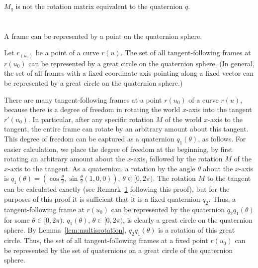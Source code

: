 \begin{rmk}
$M_q$ is not the rotation matrix equivalent to the quaternion $q$.
\end{rmk}

\section{}

A frame can be represented by a point on the quaternion sphere.

\begin{theorem}
\label{thm:greatcircle}
Let $r_(u_0)$ be a point of a curve $r(u)$.
The set of all tangent-following frames at $r(u_0)$
can be represented by a great circle on the quaternion sphere.
(In general, the set of all frames with a fixed coordinate axis pointing
along a fixed vector can be represented by a great circle on the quaternion sphere.)
\end{theorem}
\prf
There are many tangent-following frames at a point $r(u_0)$ of a curve $r(u)$,
because there is a degree of freedom in rotating the world $x$-axis
into the tangent $r'(u_0)$.
In particular, after any specific rotation $M$ of the world $x$-axis
to the tangent, the entire frame can rotate by an arbitrary amount
about this tangent.
This degree of freedom can be captured as a quaternion $q_1(\theta)$,
as follows.
For easier calculation, we place the degree of freedom at the beginning,
by first rotating an arbitrary amount about the $x$-axis,
followed by the rotation $M$ of the $x$-axis to the tangent.
As a quaternion, a rotation by the angle $\theta$ about the $x$-axis 
is $q_1(\theta) = (\cos \frac{\theta}{2}, \sin \frac{\theta}{2} (1,0,0))$,
$\theta \in [0,2\pi)$.
The rotation $M$ to the tangent can be calculated exactly (see Remark~\ref{}
following this proof), but for the purposes of this proof it is sufficient
that it is a fixed quaternion $q_2$.
Thus, a tangent-following frame at $r(u_0)$ can be represented
by the quaternion $q_2 q_1(\theta)$ for some $\theta \in [0,2\pi)$.
$q_1(\theta)$, $\theta \in [0,2\pi)$, is clearly a great circle
on the quaternion sphere.
By Lemma~\ref{lem:multisrotation}, 
$q_2 q_1(\theta)$ is a rotation of this great circle.
Thus, the set of all tangent-following frames at a fixed point $r(u_0)$
can be represented by the set of quaternions on a great circle
of the quaternion sphere.
\QED

